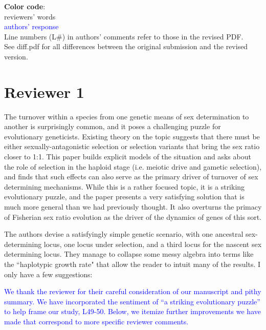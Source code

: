 \documentclass[10pt,letterpaper]{article}
\begin{document}
\noindent\textbf{Color code}:\\
reviewers' words\\
\textcolor{blue}{authors' response}
\\

\noindent  Line numbers (L\#) in authors' comments refer to those in the revised PDF.
\\

\noindent See diff.pdf for all differences between the original submission and the revised version.

\section{Reviewer 1}

The turnover within a species from one genetic means of sex determination to another is surprisingly common, and it poses a challenging puzzle for evolutionary geneticists.  Existing theory on the topic suggests that there must be either sexually-antagonistic selection or selection variants that bring the sex ratio closer to 1:1.  This paper builds explicit models of the situation and asks about the role of selection in the haploid stage (i.e. meiotic drive and gametic selection), and finds that such effects can also serve as the primary driver of turnover of sex determining mechanisms.  While this is a rather focused topic, it is a striking evolutionary puzzle, and the paper presents a very satisfying solution that is much more general than we had previously thought.  It also overturns the primacy of Fisherian sex ratio evolution as the driver of the dynamics of genes of this sort.

The authors devise a satisfyingly simple genetic scenario, with one ancestral sex-determining locus, one locus under selection, and a third locus for the nascent sex determining locus.  They manage to collapse some messy algebra into terms like the ``haplotypic growth rate" that allow the reader to intuit many of the results.  I only have a few suggestions:

\textcolor{blue}{
We thank the reviewer for their careful consideration of our manuscript and pithy summary. We have incorporated the sentiment of ``a striking evolutionary puzzle'' to help frame our study, L49-50. Below, we itemize further improvements we have made that correspond to more specific reviewer comments. 
}
\end{document}
